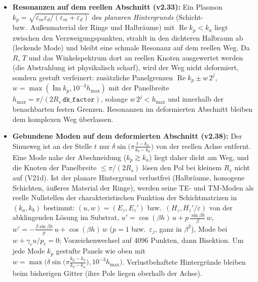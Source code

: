 \begin{itemize}[nosep]
        aus. Auf dem Weg gilt der Wurzelzweig \eqref{eq:beta_branch} unverändert ($\operatorname{Im}\beta^2>0$). Die
        Deformation ist nur nötig, wenn der Hintergrund gebundene Moden trägt (Prüfung: Eigenwerte der Hintergrund-S-Matrix
        im Intervall; sonst Weg reell). Gebundene Moden verlassen die Struktur seitlich; ihr Fluss erscheint nicht in
        oben/unten (Ausgaben).
  \item \textbf{Resonanzen auf dem reellen Abschnitt (v2.33):} Ein Plasmon $k_p=\sqrt{\varepsilon_m\varepsilon_d/
        (\varepsilon_m+\varepsilon_d)}$ des \emph{planaren Hintergrunds} (Schicht- bzw.\ Außenmaterial der Ringe und
        Halbräume) mit $\operatorname{Re}k_p<k_a$ liegt zwischen den Verzweigungspunkten, strahlt in den dichteren
        Halbraum ab (leckende Mode) und bleibt eine schmale Resonanz auf dem reellen Weg. Da $R$, $T$ und das
        Winkelspektrum dort an reellen Knoten ausgewertet werden (die Abstrahlung ist physikalisch scharf), wird der
        Weg nicht deformiert, sondern gestuft verfeinert: zusätzliche Panelgrenzen
        $\operatorname{Re}k_p\pm w\,2^j$, $w=\max(\operatorname{Im}k_p,10^{-3}h_{\max})$ mit der Panelbreite $h_{\max}=\pi/(2R_s\,\mathtt{dk\_factor})$, solange $w\,2^j<h_{\max}$ und
        innerhalb der benachbarten festen Grenzen. Resonanzen im deformierten Abschnitt bleiben dem komplexen Weg
        überlassen.
  \item \textbf{Gebundene Moden auf dem deformierten Abschnitt (v2.38):} Der Sinusweg ist an der Stelle $t$ nur
        $\delta\sin\big(\pi\tfrac{t-k_a}{k_b-k_a}\big)$ von der reellen Achse entfernt. Eine Mode nahe der Abschneidung
        ($k_p\gtrsim k_a$) liegt daher dicht am Weg, und die Knoten der Panelbreite $\le\pi/(2R_s)$ lösen den Pol bei
        kleinem $R_s$ nicht auf (V21d). Ist der planare Hintergrund verlustfrei (Halbräume, homogene Schichten, äußeres
        Material der Ringe), werden seine TE- und TM-Moden als reelle Nullstellen der charakteristischen Funktion der
        Schichtmatrizen in $(k_a,k_b)$ bestimmt: $(u,w)=(E_z,E_z')$ bzw.\ $(H_z,H_z'/\varepsilon)$ von der abklingenden
        Lösung im Substrat, $u'=\cos(\beta h)\,u+p\,\tfrac{\sin\beta h}{\beta}\,w$,
        $w'=-\tfrac{\beta\sin\beta h}{p}\,u+\cos(\beta h)\,w$ ($p=1$ bzw.\ $\varepsilon_j$, ganz in $\beta^2$), Mode bei
        $w+\gamma_c u/p_c=0$; Vorzeichenwechsel auf 4096 Punkten, dann Bisektion. Um jede Mode $k_p$ gestufte Panels wie
        oben mit $w=\max\big(\delta\sin\big(\pi\tfrac{k_p-k_a}{k_b-k_a}\big),10^{-3}h_{\max}\big)$. Verlustbehaftete
        Hintergründe bleiben beim bisherigen Gitter (ihre Pole liegen oberhalb der Achse).
\end{itemize}

